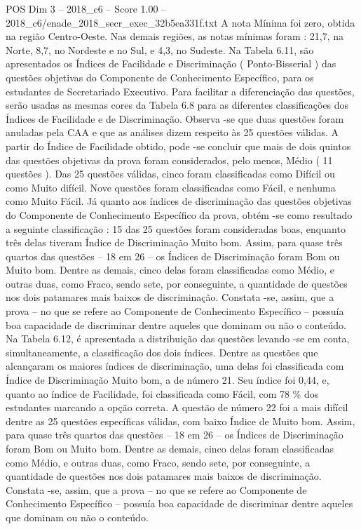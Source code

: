 \begin{textsample}{POS Dim 3 – 2018\_c6 – Score 1.00 – 2018\_c6/enade\_2018\_secr\_exec\_32b5ea331f.txt}
A nota Mínima foi zero, obtida na região Centro-Oeste.
Nas demais regiões, as notas mínimas foram : 21,7, na Norte, 8,7, no Nordeste e no Sul, e 4,3, no Sudeste.
Na Tabela 6.11, são apresentados os Índices de Facilidade e Discriminação ( Ponto-Bisserial ) das questões objetivas do Componente de Conhecimento Específico, para os estudantes de Secretariado Executivo.
Para facilitar a diferenciação das questões, serão usadas as mesmas cores da Tabela 6.8 para as diferentes classificações dos Índices de Facilidade e de Discriminação.
Observa -se que duas questões foram anuladas pela CAA e que as análises dizem respeito às 25 questões válidas.
A partir do Índice de Facilidade obtido, pode -se concluir que mais de dois quintos das questões objetivas da prova foram considerados, pelo menos, Médio ( 11 questões ).
Das 25 questões válidas, cinco foram classificadas como Difícil ou como Muito difícil.
Nove questões foram classificadas como Fácil, e nenhuma como Muito Fácil.
Já quanto aos índices de discriminação das questões objetivas do Componente de Conhecimento Específico da prova, obtém -se como resultado a seguinte classificação : 15 das 25 questões foram consideradas boas, enquanto três delas tiveram Índice de Discriminação Muito bom.
Assim, para quase três quartos das questões – 18 em 26 – os Índices de Discriminação foram Bom ou Muito bom.
Dentre as demais, cinco delas foram classificadas como Médio, e outras duas, como Fraco, sendo sete, por conseguinte, a quantidade de questões nos dois patamares mais baixos de discriminação.
Constata -se, assim, que a prova – no que se refere ao Componente de Conhecimento Específico – possuía boa capacidade de discriminar dentre aqueles que dominam ou não o conteúdo.
Na Tabela 6.12, é apresentada a distribuição das questões levando -se em conta, simultaneamente, a classificação dos dois índices.
Dentre as questões que alcançaram os maiores índices de discriminação, uma delas foi classificada com Índice de Discriminação Muito bom, a de número 21.
Seu índice foi 0,44, e, quanto ao índice de Facilidade, foi classificada como Fácil, com 78 \% dos estudantes marcando a opção correta.
A questão de número 22 foi a mais difícil dentre as 25 questões específicas válidas, com baixo Índice de Muito bom.
Assim, para quase três quartos das questões – 18 em 26 – os Índices de Discriminação foram Bom ou Muito bom.
Dentre as demais, cinco delas foram classificadas como Médio, e outras duas, como Fraco, sendo sete, por conseguinte, a quantidade de questões nos dois patamares mais baixos de discriminação.
Constata -se, assim, que a prova – no que se refere ao Componente de Conhecimento Específico – possuía boa capacidade de discriminar dentre aqueles que dominam ou não o conteúdo.

\end{textsample}
